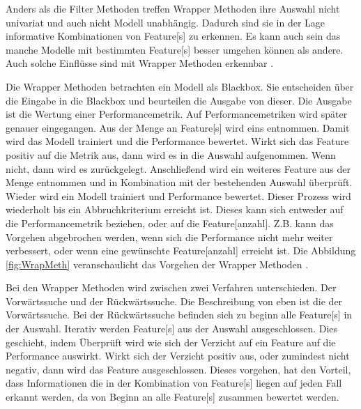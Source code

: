 Anders als die \gls{Filter Methoden} treffen \gls{Wrapper Methoden} ihre Auswahl nicht univariat und auch nicht Modell unabhängig. Dadurch sind sie in der Lage informative Kombinationen von \gls{Feature}[s] zu erkennen. Es kann auch sein das manche Modelle mit bestimmten \gls{Feature}[s] besser umgehen können als andere. Auch solche Einflüsse sind mit \gls{Wrapper Methoden} erkennbar \cite{Kuhn.2013, Guyon.2003}. \par

Die \gls{Wrapper Methoden} betrachten ein Modell als Blackbox. Sie entscheiden über die Eingabe in die Blackbox und beurteilen die Ausgabe von dieser. Die Ausgabe ist die Wertung einer Performancemetrik. Auf Performancemetriken wird später genauer eingegangen. Aus der Menge an \gls{Feature}[s] wird eins entnommen. Damit wird das Modell trainiert und die Performance bewertet. Wirkt sich das \gls{Feature} positiv auf die Metrik aus, dann wird es in die Auswahl aufgenommen. Wenn nicht, dann wird es zurückgelegt. Anschließend wird ein weiteres \gls{Feature} aus der Menge entnommen und in Kombination mit der bestehenden Auswahl überprüft. Wieder wird ein Modell trainiert und Performance bewertet. Dieser Prozess wird wiederholt bis ein Abbruchkriterium erreicht ist. Dieses kann sich entweder auf die Performancemetrik beziehen, oder auf die \gls{Feature}[anzahl]. Z.B. kann das Vorgehen abgebrochen werden, wenn sich die Performance nicht mehr weiter verbessert, oder wenn eine gewünschte \gls{Feature}[anzahl] erreicht ist. Die Abbildung \ref{fig:WrapMeth} veranschaulicht das Vorgehen der \gls{Wrapper Methoden} \cite{Kuhn.2013, Guyon.2003}.


Bei den \gls{Wrapper Methoden} wird zwischen zwei Verfahren unterschieden. Der Vorwärtssuche und der Rückwärtssuche. Die Beschreibung von eben ist die der Vorwärtssuche. Bei der Rückwärtssuche befinden sich zu beginn alle \gls{Feature}[s] in der Auswahl. Iterativ werden \gls{Feature}[s] aus der Auswahl ausgeschlossen. Dies geschieht, indem Überprüft wird wie sich der Verzicht auf ein \gls{Feature} auf die Performance auswirkt. Wirkt sich der Verzicht positiv aus, oder zumindest nicht negativ, dann wird das \gls{Feature} ausgeschlossen. Dieses vorgehen, hat den Vorteil, dass Informationen die in der Kombination von \gls{Feature}[s] liegen auf jeden Fall erkannt werden, da von Beginn an alle \gls{Feature}[s] zusammen bewertet werden. \dubpar

